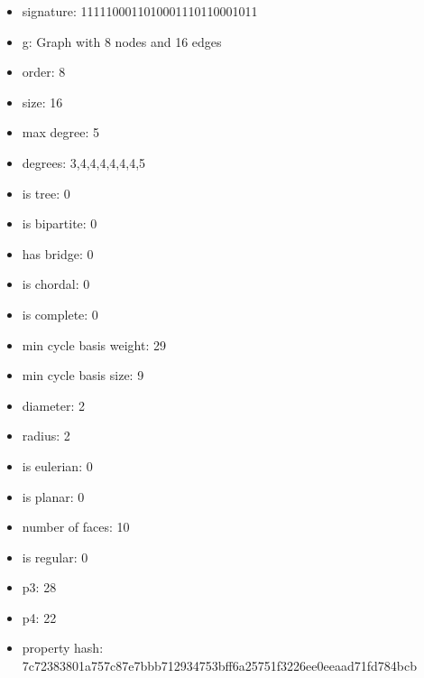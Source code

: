 \begin{itemize}
\item signature: 1111100011010001110110001011
\item g: Graph with 8 nodes and 16 edges
\item order: 8
\item size: 16
\item max degree: 5
\item degrees: 3,4,4,4,4,4,4,5
\item is tree: 0
\item is bipartite: 0
\item has bridge: 0
\item is chordal: 0
\item is complete: 0
\item min cycle basis weight: 29
\item min cycle basis size: 9
\item diameter: 2
\item radius: 2
\item is eulerian: 0
\item is planar: 0
\item number of faces: 10
\item is regular: 0
\item p3: 28
\item p4: 22
\item property hash: 7c72383801a757c87e7bbb712934753bff6a25751f3226ee0eeaad71fd784bcb
\end{itemize}
\newpage
\begin{figure}
\end{figure}

